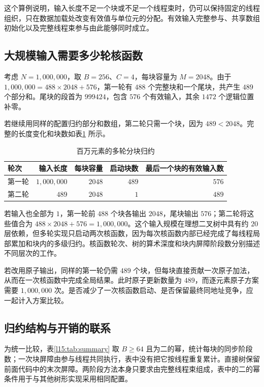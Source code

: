 这个算例说明，输入长度不足一个块或不足一个线程束时，仍可以保持固定的线程组织，只在数据加载处改变有效值与单位元的分配。有效输入完整参与、共享数组初始化以及完整线程束参与由此能够同时成立。

\subsection{大规模输入需要多少轮核函数}

考虑 $N=1{,}000{,}000$，取 $B=256$、$C=4$，每块容量为 $M=2048$。由于 $1{,}000{,}000=488\times2048+576$，第一轮有 $488$ 个完整块和一个尾块，共产生 $489$ 个部分和。尾块的段首为 $999424$，包含 $576$ 个有效输入，其余 $1472$ 个逻辑位置补零。

若继续用同样的配置归约部分和数组，第二轮只需一个块，因为 $489<2048$。完整的长度变化和块数如表\ref{l15:tab:rounds} 所示。

\begin{table}[htbp]
\centering
\caption{百万元素的多轮分块归约}
\label{l15:tab:rounds}
\begin{tabular}{@{}lrrrr@{}}
\toprule
轮次 & 输入长度 & 每块容量 & 启动块数 & 最后一个块的有效输入数\\
\midrule
第一轮 & $1{,}000{,}000$ & $2048$ & $489$ & $576$\\
第二轮 & $489$ & $2048$ & $1$ & $489$\\
\bottomrule
\end{tabular}
\end{table}

若输入也全部为 $1$，第一轮前 $488$ 个块各输出 $2048$，尾块输出 $576$；第二轮将这些值合为 $488\times2048+576=1{,}000{,}000$。这个输入规模在理想二叉树中具有约 $20$ 层依赖，但多轮实现只启动两次核函数，因为每次核函数内部已经完成了每线程局部累加和块内的多级归约。核函数轮次、树的算术深度和块内屏障阶段数分别描述不同层次的工作。

若改用原子输出，同样的第一轮仍需 $489$ 个块，但每块直接贡献一次原子加法，从而在一次核函数中完成全局结果。此时原子更新数量为 $489$，而逐元素原子方案需要 $1{,}000{,}000$ 次。是否减少了一次核函数启动、是否保留最终同地址竞争，应一起计入方案比较。

\subsection{归约结构与开销的联系}

为统一比较，表\ref{l15:tab:summary} 取 $B\geq64$ 且为二的幂，统计每块的同步阶段数；一次块屏障由参与线程共同执行，表中没有把它按线程重复累计。直接树保留前面代码中的末次屏障。两阶段方法本身只要求由完整线程束组成，表中的二的幂条件用于与其他树形实现采用相同配置。

